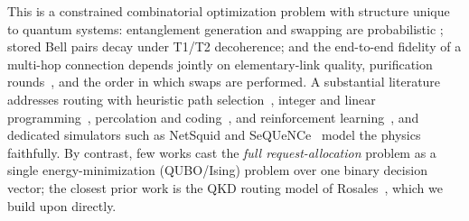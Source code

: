 \documentclass[twocolumn]{article}
\begin{document}
This is a constrained combinatorial optimization problem with
structure unique to quantum systems: entanglement generation and
swapping are probabilistic \cite{bennett1993teleporting,
vanmeter2014quantum}; stored Bell pairs decay under T1/T2
decoherence; and the end-to-end fidelity of a multi-hop connection
depends jointly on elementary-link quality, purification
rounds~\cite{bennett1996purification}, and the order in which swaps
are performed.  A substantial literature addresses routing with
heuristic path selection~\cite{vanmeter2014quantum}, integer and
linear programming~\cite{pant2022routing,caleffi2017optimal,
gyongyosi2019entanglement}, percolation and
coding~\cite{cuquet2009entanglement,schoute2016shortcuts,
kozlowski2020designing}, and reinforcement
learning~\cite{li2025qlearning,boyan1993packet,mao2017routing,
rusek2020routenets}, and dedicated simulators such as NetSquid and
SeQUeNCe~\cite{coopmans2021netsquid,wu2021sequence} model the physics
faithfully.  By contrast, few works cast the \emph{full
request-allocation} problem as a single energy-minimization
(QUBO/Ising) problem over one binary decision vector; the closest
prior work is the QKD routing model of
Rosales~\cite{rosales2025quantum}, which we build upon directly.
\end{document}
